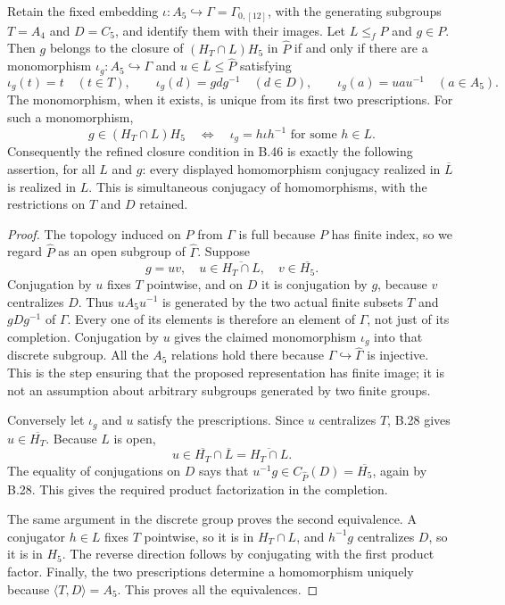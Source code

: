 Retain the fixed embedding $\iota:A_5\hookrightarrow
\Gamma=\Gamma_{0,[12]}$, with the generating subgroups
$T=A_4$ and $D=C_5$, and identify them with their images.
Let $L\leq_f P$ and $g\in P$.
Then $g$ belongs to the closure of $(H_T\cap L)H_5$ in
$\widehat P$ if and only if there are a monomorphism
$\iota_g:A_5\hookrightarrow\Gamma$ and
$u\in\overline L\leq\widehat P$ satisfying
\[
 \iota_g(t)=t\quad(t\in T),\qquad
 \iota_g(d)=g d g^{-1}\quad(d\in D),\qquad
 \iota_g(a)=u a u^{-1}\quad(a\in A_5).
\]
The monomorphism, when it exists, is unique from its first
two prescriptions.  For such a monomorphism,
\[
 g\in(H_T\cap L)H_5
 \quad\Longleftrightarrow\quad
 \iota_g=h\iota h^{-1}\text{ for some }h\in L.
\]
Consequently the refined closure condition in B.46 is
exactly the following assertion, for all $L$ and $g$:
every displayed homomorphism conjugacy realized in
$\overline L$ is realized in $L$.
This is simultaneous conjugacy of homomorphisms, with
the restrictions on $T$ and $D$ retained.
\begin{proof}
The topology induced on $P$ from $\Gamma$ is full because
$P$ has finite index, so we regard $\widehat P$ as an open
subgroup of $\widehat\Gamma$.
Suppose
\[
 g=uv,
 \quad u\in\overline{H_T\cap L},
 \quad v\in\overline{H_5}.
\]
Conjugation by $u$ fixes $T$ pointwise, and on $D$ it is
conjugation by $g$, because $v$ centralizes $D$.
Thus $uA_5u^{-1}$ is generated by the two actual finite
subsets $T$ and $gDg^{-1}$ of $\Gamma$.
Every one of its elements is therefore an element of
$\Gamma$, not just of its completion.  Conjugation by $u$
gives the claimed monomorphism $\iota_g$ into that
discrete subgroup.  All the $A_5$ relations hold there
because $\Gamma\hookrightarrow\widehat\Gamma$ is
injective.  This is the step ensuring that the proposed
representation has finite image; it is not an assumption
about arbitrary subgroups generated by two finite groups.

Conversely let $\iota_g$ and $u$ satisfy the prescriptions.
Since $u$ centralizes $T$, B.28 gives
$u\in\overline{H_T}$.  Because $L$ is open,
\[
 u\in\overline{H_T}\cap\overline L
       =\overline{H_T\cap L}.
\]
The equality of conjugations on $D$ says that
$u^{-1}g\in C_{\widehat P}(D)=\overline{H_5}$,
again by B.28.  This gives the required product
factorization in the completion.

The same argument in the discrete group proves the second
equivalence.  A conjugator $h\in L$ fixes $T$ pointwise,
so it is in $H_T\cap L$, and $h^{-1}g$ centralizes $D$,
so it is in $H_5$.  The reverse direction follows by
conjugating with the first product factor.
Finally, the two prescriptions determine a homomorphism
uniquely because $\langle T,D\rangle=A_5$.
This proves all the equivalences.
\end{proof}

